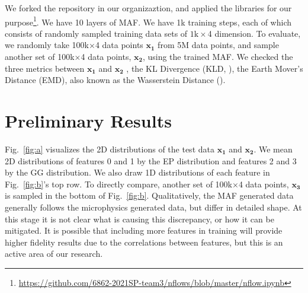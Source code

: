We forked the repository in our organizaztion, and applied the libraries for our purpose\footnote{\url{https://github.com/6862-2021SP-team3/nflows/blob/master/nflow.ipynb}}. We have 10 layers of MAF. We have 1k training steps, each of which consists of randomly sampled training data sets of $1\text{k}\times$4 dimension. To evaluate, we randomly take 100k$\times$4 data points $\mathbf{x_1}$ from 5M data points, and sample another set of 100k$\times$4 data points, $\mathbf{x_2}$, using the trained MAF. We checked the three metrics between $\mathbf{x_1}$ and $\mathbf{x_2}$ , the KL Divergence (KLD, \citet{Kullback51klDivergence}), the Earth Mover's Distance (EMD), also known as the Wasserstein Distance (\citet{Dobrushin}).

\section{Preliminary Results}
Fig.~\ref{fig:a} visualizes the 2D distributions of the test data $\mathbf{x_1}$ and $\mathbf{x_2}$. We mean 2D distributions of features 0 and 1 by the EP distribution and features 2 and 3 by the GG distribution. We also draw 1D distributions of each feature in Fig.~\ref{fig:b}'s top row. To directly compare, another set of 100k$\times$4 data points, $\mathbf{x_3}$ is sampled in the bottom of Fig.~\ref{fig:b}. Qualitatively, the MAF generated data generally follows the microphysics generated data, but differ in detailed shape. At this stage it is not clear what is causing this discrepancy, or how it can be mitigated. It is possible that including more features in training will provide higher fidelity results due to the correlations between features, but this is an active area of our research.

